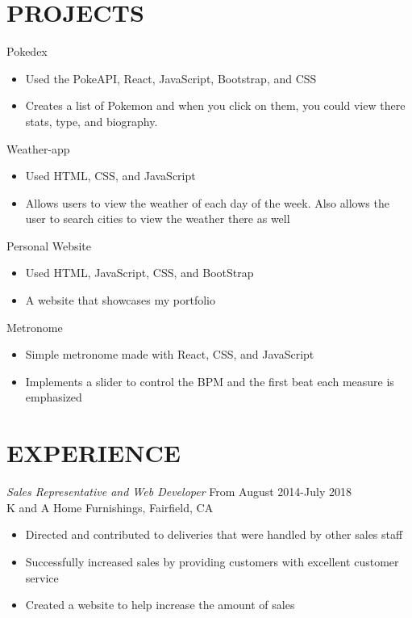 \documentclass[margin]{res}
\begin{document}
\begin{resume}
\section{PROJECTS}     
	Pokedex
 		\begin{itemize} \itemsep -2pt 
 		\item Used the PokeAPI, React, JavaScript, Bootstrap, and CSS
 		\item Creates a list of Pokemon and when you click on them, you could view there stats, type, and biography. 
 		\end{itemize}        
 	Weather-app
 		\begin{itemize} \itemsep -2pt 
 		\item Used HTML, CSS, and JavaScript
 		\item Allows users to view the weather of each day of the week. Also allows the user to search cities to view the weather there as well
 		\end{itemize}
 		Personal Website
 		\begin{itemize} \itemsep -2pt 
 		\item Used HTML, JavaScript, CSS, and BootStrap
 		\item A website that showcases my portfolio 
 		\end{itemize}
 	Metronome
 		\begin{itemize} \itemsep -2pt 
 		\item Simple metronome made with React, CSS, and JavaScript
 		\item Implements a slider to control the BPM and the first beat each measure is emphasized
 		\end{itemize}
 		
\section{EXPERIENCE} {\sl Sales Representative and Web Developer} \hfill From August 2014-July 2018 \\ 
                K and A Home Furnishings, Fairfield, CA 
                 \begin{itemize}  \itemsep -2pt 
                 \item  Directed and contributed to deliveries that were handled by other sales staff
                \item   Successfully increased sales by providing customers with excellent customer service  
                \item Created a website to help increase the amount of sales 
                \end{itemize}

\end{resume}
\end{document}
